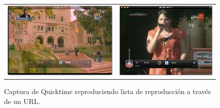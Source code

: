 \begin{figure}[H]
	\centering
	\begin{tabular}{cc}
	\includegraphics[scale=0.3]{imgs/qt-mega.png} & 
	\includegraphics[scale=0.3]{imgs/qt-tvn.png} \\
	\end{tabular}
	\caption{Captura de Quicktime reproduciendo lista de reproducción a través de un URL.}
	\label{qt-tvn-mega}
\end{figure}



